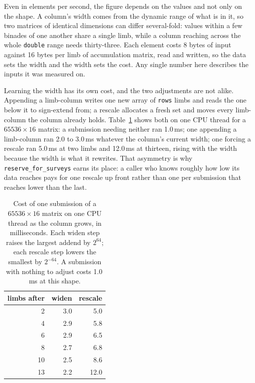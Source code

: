 \documentclass[acmsmall,screen,review]{acmart}
\newcommand{\code}[1]{\texttt{#1}}
\begin{document}
Even in elements per second, the figure depends on the values and not only on the shape. A column's width comes from the dynamic range of what is in it, so two matrices of identical dimensions can differ several-fold: values within a few binades of one another share a single limb, while a column reaching across the whole \code{double} range needs thirty-three. Each element costs 8 bytes of input against 16 bytes per limb of accumulation matrix, read and written, so the data sets the width and the width sets the cost. Any single number here describes the inputs it was measured on.

Learning the width has its own cost, and the two adjustments are not alike. Appending a limb-column writes one new array of \code{rows} limbs and reads the one below it to sign-extend from; a rescale allocates a fresh set and moves every limb-column the column already holds. Table~\ref{tab:adjust} shows both on one CPU thread for a $65536 \times 16$ matrix: a submission needing neither ran 1.0\,ms; one appending a limb-column ran 2.0 to 3.0\,ms whatever the column's current width; one forcing a rescale ran 5.0\,ms at two limbs and 12.0\,ms at thirteen, rising with the width because the width is what it rewrites. That asymmetry is why \code{reserve\_for\_surveys} earns its place: a caller who knows roughly how low its data reaches pays for one rescale up front rather than one per submission that reaches lower than the last.

\begin{table}[t]
\caption{Cost of one submission of a $65536 \times 16$ matrix on one CPU thread as the column grows, in milliseconds. Each widen step raises the largest addend by $2^{64}$; each rescale step lowers the smallest by $2^{-64}$. A submission with nothing to adjust costs 1.0\,ms at this shape.}
\label{tab:adjust}
\begin{tabular}{rrr}
\toprule
limbs after & widen & rescale \\
\midrule
2 & 3.0 & 5.0 \\
4 & 2.9 & 5.8 \\
6 & 2.9 & 6.5 \\
8 & 2.7 & 6.8 \\
10 & 2.5 & 8.6 \\
13 & 2.2 & 12.0 \\
\bottomrule
\end{tabular}
\end{table}
\end{document}
